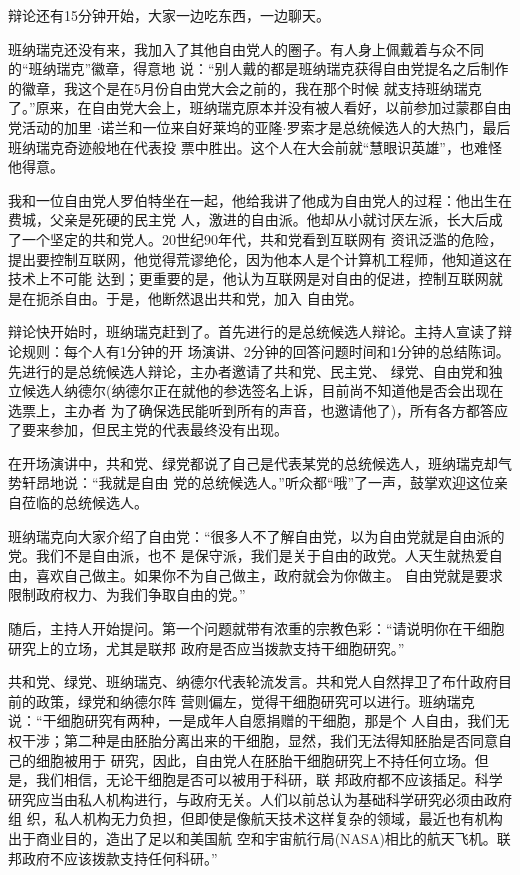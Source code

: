 ﻿\documentclass[11pt]{article}
\begin{document}
辩论还有15分钟开始，大家一边吃东西，一边聊天。

班纳瑞克还没有来，我加入了其他自由党人的圈子。有人身上佩戴着与众不同的``班纳瑞克''徽章，得意地
说：``别人戴的都是班纳瑞克获得自由党提名之后制作的徽章，我这个是在5月份自由党大会之前的，我在那个时候
就支持班纳瑞克了。''原来，在自由党大会上，班纳瑞克原本并没有被人看好，以前参加过蒙郡自由党活动的加里
$\cdot$诺兰和一位来自好莱坞的亚隆$\cdot$罗索才是总统候选人的大热门，最后班纳瑞克奇迹般地在代表投
票中胜出。这个人在大会前就``慧眼识英雄''，也难怪他得意。

我和一位自由党人罗伯特坐在一起，他给我讲了他成为自由党人的过程：他出生在费城，父亲是死硬的民主党
人，激进的自由派。他却从小就讨厌左派，长大后成了一个坚定的共和党人。20世纪90年代，共和党看到互联网有
资讯泛滥的危险，提出要控制互联网，他觉得荒谬绝伦，因为他本人是个计算机工程师，他知道这在技术上不可能
达到；更重要的是，他认为互联网是对自由的促进，控制互联网就是在扼杀自由。于是，他断然退出共和党，加入
自由党。

辩论快开始时，班纳瑞克赶到了。首先进行的是总统候选人辩论。主持人宣读了辩论规则：每个人有1分钟的开
场演讲、2分钟的回答问题时间和1分钟的总结陈词。先进行的是总统候选人辩论，主办者邀请了共和党、民主党、
绿党、自由党和独立候选人纳德尔(纳德尔正在就他的参选签名上诉，目前尚不知道他是否会出现在选票上，主办者
为了确保选民能听到所有的声音，也邀请他了)，所有各方都答应了要来参加，但民主党的代表最终没有出现。

在开场演讲中，共和党、绿党都说了自己是代表某党的总统候选人，班纳瑞克却气势轩昂地说：``我就是自由
党的总统候选人。''听众都``哦''了一声，鼓掌欢迎这位亲自莅临的总统候选人。

班纳瑞克向大家介绍了自由党：``很多人不了解自由党，以为自由党就是自由派的党。我们不是自由派，也不
是保守派，我们是关于自由的政党。人天生就热爱自由，喜欢自己做主。如果你不为自己做主，政府就会为你做主。
自由党就是要求限制政府权力、为我们争取自由的党。''

随后，主持人开始提问。第一个问题就带有浓重的宗教色彩：``请说明你在干细胞研究上的立场，尤其是联邦
政府是否应当拨款支持干细胞研究。''

共和党、绿党、班纳瑞克、纳德尔代表轮流发言。共和党人自然捍卫了布什政府目前的政策，绿党和纳德尔阵
营则偏左，觉得干细胞研究可以进行。班纳瑞克说：``干细胞研究有两种，一是成年人自愿捐赠的干细胞，那是个
人自由，我们无权干涉；第二种是由胚胎分离出来的干细胞，显然，我们无法得知胚胎是否同意自己的细胞被用于
研究，因此，自由党人在胚胎干细胞研究上不持任何立场。但是，我们相信，无论干细胞是否可以被用于科研，联
邦政府都不应该插足。科学研究应当由私人机构进行，与政府无关。人们以前总认为基础科学研究必须由政府组
织，私人机构无力负担，但即使是像航天技术这样复杂的领域，最近也有机构出于商业目的，造出了足以和美国航
空和宇宙航行局(NASA)相比的航天飞机。联邦政府不应该拨款支持任何科研。''
\end{document}
